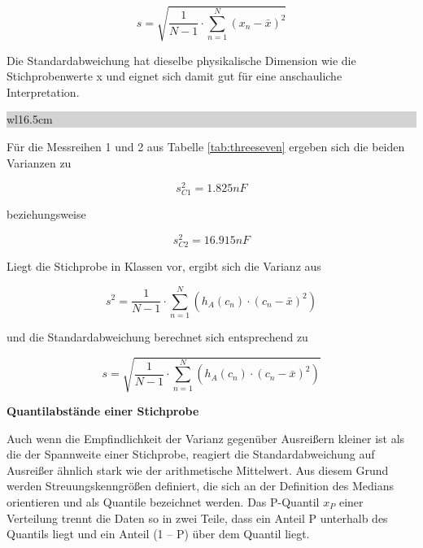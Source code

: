 \begin{equation}\label{eq:threethirtyseven}
s=\sqrt{\dfrac{1}{N-1} \cdot \sum _{n=1}^{N}(x_{n} -\bar{x})^{2}}
\end{equation}

\noindent Die Standardabweichung hat dieselbe physikalische Dimension wie die Stichprobenwerte x und eignet sich damit gut f\"{u}r eine anschauliche Interpretation.\bigskip

\noindent
\colorbox{lightgray}{%
%
\renewcommand\arraystretch{0.6}%
\begin{tabular}{ wl{16.5cm} }
{\selectfont
{}}
\end{tabular}%
}\bigskip

\noindent F\"{u}r die Messreihen 1 und 2 aus Tabelle \ref{tab:threeseven} ergeben sich die beiden Varianzen zu 

\begin{equation}\label{eq:threethirtyeight}
s_{C1}^{2} = 1.825 nF
\end{equation}

\noindent beziehungsweise 

\begin{equation}\label{eq:threethirtynine}
s_{C2}^{2} = 16.915 nF
\end{equation} 

\noindent Liegt die Stichprobe in Klassen vor, ergibt sich die Varianz aus 

\begin{equation}\label{eq:threefourty}
s^{2} =\dfrac{1}{N-1} \cdot \sum _{n=1}^{N}\left(h_{A} (c_{n})\cdot (c_{n} -\bar{x})^{2} \right)
\end{equation} 

\noindent und die Standardabweichung berechnet sich entsprechend zu

\begin{equation}\label{eq:threefourtyone}
s=\sqrt{\dfrac{1}{N-1} \cdot \sum _{n=1}^{N}\left(h_{A} (c_{n})\cdot (c_{n} -\bar{x})^{2} \right)}
\end{equation} 

{\selectfont
\noindent\textbf{Quantilabst\"{a}nde einer Stichprobe}}

\noindent Auch wenn die Empfindlichkeit der Varianz gegen\"{u}ber Ausrei{\ss}ern kleiner ist als die der Spannweite einer Stichprobe, reagiert die Standardabweichung auf Ausrei{\ss}er \"{a}hnlich stark wie der arithmetische Mittelwert. Aus diesem Grund werden Streuungskenngr\"{o}{\ss}en definiert, die sich an der Definition des Medians orientieren und als Quantile bezeichnet werden. Das P-Quantil $x_{P}$ einer Verteilung trennt die Daten so in zwei Teile, dass ein Anteil P unterhalb des Quantils liegt und ein Anteil (1 -- P) \"{u}ber dem Quantil liegt. 

